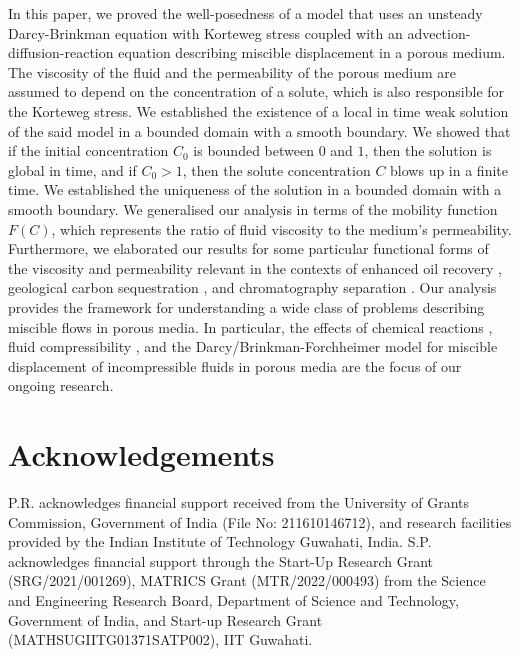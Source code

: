 \documentclass[final,3p,times]{elsarticle}
\theoremstyle{plain}
\theoremstyle{remark}
\theoremstyle{plain}
\theoremstyle{remark}
\begin{document}
 In this paper, we proved the well-posedness of a model that uses an unsteady Darcy-Brinkman equation with Korteweg stress coupled with an advection-diffusion-reaction equation describing miscible displacement in a porous medium. The viscosity of the fluid and the permeability of the porous medium are assumed to depend on the concentration of a solute, which is also responsible for the Korteweg stress. We established the existence of a local in time weak solution of the said model in a bounded domain with a smooth boundary. We showed that if the initial concentration $C_0$ is bounded between $0$ and $1$, then the solution is global in time, and if $C_0>1$, then the solute concentration $C$ blows up in a finite time. We established the uniqueness of the solution in a bounded domain with a smooth boundary. We generalised our analysis in terms of the mobility function $F(C)$, which represents the ratio of fluid viscosity to the medium's permeability. Furthermore, we elaborated our results for some particular functional forms of the viscosity and permeability relevant in the contexts of enhanced oil recovery \citep{homsy1987viscous}, geological carbon sequestration \citep{huppert2014fluid}, and chromatography separation \citep{rana2019influence}. 
Our analysis provides the framework for understanding a wide class of problems describing miscible flows in porous media. In particular, the effects of chemical reactions \citep{nagatsu2014hydrodynamic}, fluid compressibility \citep{morrow2023gas}, and the Darcy/Brinkman-Forchheimer model for miscible displacement of incompressible fluids in porous media \citep{dehghan2024fully, caucao2020fully, caucao2022posteriori} are the focus of our ongoing research. 

\section*{Acknowledgements}
P.R. acknowledges financial support received from the University of
Grants Commission, Government of India (File No:  211610146712), and research facilities provided by the Indian Institute of Technology Guwahati, India. S.P. acknowledges financial support through the Start-Up Research Grant (SRG/2021/001269), MATRICS Grant (MTR/2022/000493) from the Science and Engineering Research Board, Department of Science and Technology, Government of India, and Start-up Research Grant (MATHSUGIITG01371SATP002), IIT Guwahati. 



\end{document}
